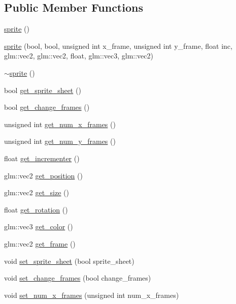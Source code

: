 \subsection*{Public Member Functions}
\begin{DoxyCompactItemize}
\item 
\hyperlink{classsprite_ab301a52437b1fedba953a3a3003d3a0d}{sprite} ()
\item 
\hyperlink{classsprite_a16fd4fd92c1244afa585c3b6ef3994ca}{sprite} (bool, bool, unsigned int x\+\_\+frame, unsigned int y\+\_\+frame, float inc, glm\+::vec2, glm\+::vec2, float, glm\+::vec3, glm\+::vec2)
\item 
\hyperlink{classsprite_aa2c57852113368003657c673e39b6f3a}{$\sim$sprite} ()
\item 
bool \hyperlink{classsprite_a6b2f3ae0858b040330d66a547543d91e}{get\+\_\+sprite\+\_\+sheet} ()
\item 
bool \hyperlink{classsprite_a935dcb319f155f0fcb698e2c082e3f2c}{get\+\_\+change\+\_\+frames} ()
\item 
unsigned int \hyperlink{classsprite_aebcc7d599cc15c0257382d23ec5cf4c0}{get\+\_\+num\+\_\+x\+\_\+frames} ()
\item 
unsigned int \hyperlink{classsprite_abc1ab26e93ef1343ca030a14a8b4d250}{get\+\_\+num\+\_\+y\+\_\+frames} ()
\item 
float \hyperlink{classsprite_a34d638c04ee20e0640b121432a9b2bc2}{get\+\_\+incrementer} ()
\item 
glm\+::vec2 \hyperlink{classsprite_a07206378cd6008b2652906d348a0ea7c}{get\+\_\+position} ()
\item 
glm\+::vec2 \hyperlink{classsprite_afe4f7c1f28277a1942cf5f5bb5058fde}{get\+\_\+size} ()
\item 
float \hyperlink{classsprite_a7b6bbbb227a4558c7d4a0e8fc4344bca}{get\+\_\+rotation} ()
\item 
glm\+::vec3 \hyperlink{classsprite_a22a4f69358c9184a54173296d965db32}{get\+\_\+color} ()
\item 
glm\+::vec2 \hyperlink{classsprite_abf33f325e9a1dc0b7b7ff6a26fca4ba4}{get\+\_\+frame} ()
\item 
void \hyperlink{classsprite_aba784f0507715f2e5a9c9eec4c84c868}{set\+\_\+sprite\+\_\+sheet} (bool sprite\+\_\+sheet)
\item 
void \hyperlink{classsprite_ab682d38f77706a999f53a1e62bf2539e}{set\+\_\+change\+\_\+frames} (bool change\+\_\+frames)
\item 
void \hyperlink{classsprite_a87addb8ca942a7654005e2ac51ce2659}{set\+\_\+num\+\_\+x\+\_\+frames} (unsigned int num\+\_\+x\+\_\+frames)

\end{DoxyCompactItemize}
